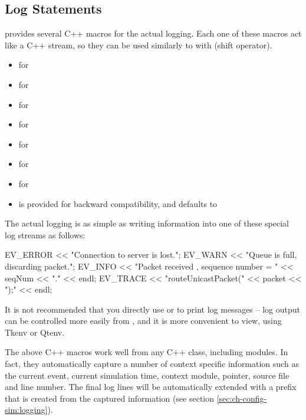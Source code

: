 \subsection{Log Statements}

{\opp} provides several C++ macros for the actual logging. Each one of these
macros act like a C++ stream, so they can be used similarly to 
with  (shift operator).

\begin{itemize}
  \item {} for 
  \item {} for 
  \item {} for 
  \item {} for 
  \item {} for 
  \item {} for 
  \item {} for 
  \item {} is provided for backward compatibility, and defaults to 
\end{itemize}

The actual logging is as simple as writing information into one of these special
log streams as follows:

\begin{cpp}
EV_ERROR << "Connection to server is lost.\n";
EV_WARN << "Queue is full, discarding packet.\n";
EV_INFO << "Packet received , sequence number = " << seqNum << "." << endl;
EV_TRACE << "routeUnicastPacket(" << packet << ");" << endl;
\end{cpp}

\begin{note}
It is not recommended that you directly use  or 
to print log messages -- log output can be controlled more easily from
, and it is more convenient to view, using Tkenv or Qtenv.
\end{note}

The above C++ macros work well from any C++ class, including {\opp} modules. In
fact, they automatically capture a number of context specific information such
as the current event, current simulation time, context module, 
pointer, source file and line number. The final log lines will be automatically
extended with a prefix that is created from the captured information (see
section \ref{sec:ch-config-sim:logging}).

